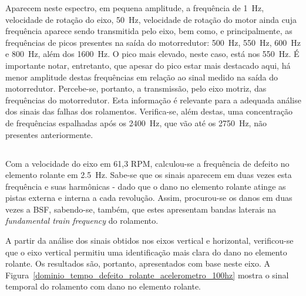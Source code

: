 \documentclass[
	12pt,				
	oneside,			
	a4paper,			
	english,			
	brazil,			
	]{abntex2ppgsi}
\begin{document}
Aparecem neste espectro, em pequena amplitude, a frequência de \SI{1}{\hertz}, velocidade de rotação do eixo, \SI{50}{\hertz}, velocidade de rotação do motor ainda cuja frequência aparece sendo transmitida pelo eixo, bem como, e principalmente, as frequências de picos presentes na saída do motorredutor:  \SI{500}{\hertz}, \SI{550}{\hertz}, \SI{600}{\hertz} e \SI{800}{\hertz}, além dos \SI{1600}{\hertz}. O pico mais elevado, neste caso, está nos \SI{550}{\hertz}. É importante notar, entretanto, que apesar do pico estar mais destacado aqui, há menor amplitude destas frequências em relação ao sinal medido na saída do motorredutor. Percebe-se, portanto, a transmissão, pelo eixo motriz, das frequências do motorredutor. Esta informação é relevante para a adequada análise dos sinais das falhas dos rolamentos. Verifica-se, além destas, uma concentração de frequências espalhadas após os \SI{2400}{\hertz}, que vão até os \SI{2750}{\hertz}, não presentes anteriormente. 

\subsection{}

Com a velocidade do eixo em 61,3 RPM, calculou-se a frequência de defeito no elemento rolante em \SI{2,5}{\hertz}. Sabe-se que os sinais aparecem em duas vezes esta frequência e suas harmônicas - dado que o dano no elemento rolante atinge as pistas externa e interna a cada revolução. Assim, procurou-se os danos em duas vezes a BSF, sabendo-se, também, que estes apresentam bandas laterais na \textit{fundamental train frequency} do rolamento. 

A partir da análise dos sinais obtidos nos eixos vertical e horizontal, verificou-se que o eixo vertical permitiu uma identificação mais clara do dano no elemento rolante. Os resultados são, portanto, apresentados com base neste eixo. A Figura~\ref{dominio_tempo_defeito_rolante_acelerometro_100hz} mostra o sinal temporal do rolamento com dano no elemento rolante.
\end{document}

